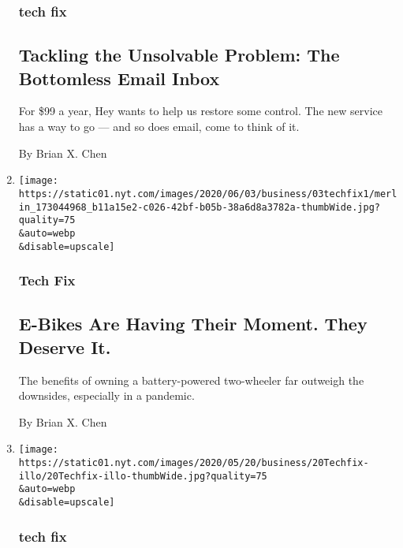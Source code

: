 \begin{enumerate}
  \hypertarget{tech-fix-4}{%
  \subsubsection{tech fix}\label{tech-fix-4}}

  \hypertarget{tackling-the-unsolvable-problem-the-bottomless-email-inbox}{%
  \subsection{Tackling the Unsolvable Problem: The Bottomless Email
  Inbox}\label{tackling-the-unsolvable-problem-the-bottomless-email-inbox}}

  For \$99 a year, Hey wants to help us restore some control. The new
  service has a way to go --- and so does email, come to think of it.

  By Brian X. Chen
\item
  \href{/2020/06/03/technology/personaltech/e-bikes-are-having-their-moment-they-deserve-it.html}{}

  \texttt{[image: https://static01.nyt.com/images/2020/06/03/business/03techfix1/merlin\_173044968\_b11a15e2-c026-42bf-b05b-38a6d8a3782a-thumbWide.jpg?quality=75\\\&auto=webp\\\&disable=upscale]}

  \hypertarget{tech-fix-5}{%
  \subsubsection{Tech Fix}\label{tech-fix-5}}

  \hypertarget{e-bikes-are-having-their-moment-they-deserve-it}{%
  \subsection{E-Bikes Are Having Their Moment. They Deserve
  It.}\label{e-bikes-are-having-their-moment-they-deserve-it}}

  The benefits of owning a battery-powered two-wheeler far outweigh the
  downsides, especially in a pandemic.

  By Brian X. Chen
\item
  \href{/2020/05/20/technology/personaltech/slow-internet-speeds.html}{}

  \texttt{[image: https://static01.nyt.com/images/2020/05/20/business/20Techfix-illo/20Techfix-illo-thumbWide.jpg?quality=75\\\&auto=webp\\\&disable=upscale]}

  \hypertarget{tech-fix-6}{%
  \subsubsection{tech fix}\label{tech-fix-6}}


\end{enumerate}
